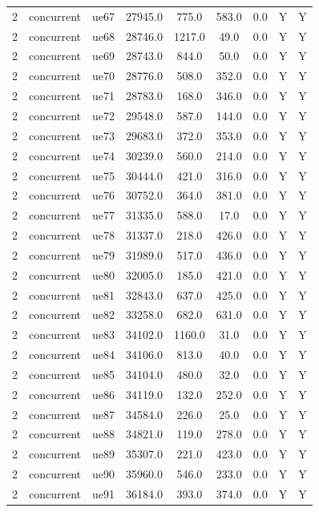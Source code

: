 \begin{table}[ht]
\begin{tabular}{|c|c|c|c|c|c|c|c|c|}
2 & concurrent & ue67 & 27945.0 & 775.0 & 583.0 & 0.0 & Y & Y \\
2 & concurrent & ue68 & 28746.0 & 1217.0 & 49.0 & 0.0 & Y & Y \\
2 & concurrent & ue69 & 28743.0 & 844.0 & 50.0 & 0.0 & Y & Y \\
2 & concurrent & ue70 & 28776.0 & 508.0 & 352.0 & 0.0 & Y & Y \\
2 & concurrent & ue71 & 28783.0 & 168.0 & 346.0 & 0.0 & Y & Y \\
2 & concurrent & ue72 & 29548.0 & 587.0 & 144.0 & 0.0 & Y & Y \\
2 & concurrent & ue73 & 29683.0 & 372.0 & 353.0 & 0.0 & Y & Y \\
2 & concurrent & ue74 & 30239.0 & 560.0 & 214.0 & 0.0 & Y & Y \\
2 & concurrent & ue75 & 30444.0 & 421.0 & 316.0 & 0.0 & Y & Y \\
2 & concurrent & ue76 & 30752.0 & 364.0 & 381.0 & 0.0 & Y & Y \\
2 & concurrent & ue77 & 31335.0 & 588.0 & 17.0 & 0.0 & Y & Y \\
2 & concurrent & ue78 & 31337.0 & 218.0 & 426.0 & 0.0 & Y & Y \\
2 & concurrent & ue79 & 31989.0 & 517.0 & 436.0 & 0.0 & Y & Y \\
2 & concurrent & ue80 & 32005.0 & 185.0 & 421.0 & 0.0 & Y & Y \\
2 & concurrent & ue81 & 32843.0 & 637.0 & 425.0 & 0.0 & Y & Y \\
2 & concurrent & ue82 & 33258.0 & 682.0 & 631.0 & 0.0 & Y & Y \\
2 & concurrent & ue83 & 34102.0 & 1160.0 & 31.0 & 0.0 & Y & Y \\
2 & concurrent & ue84 & 34106.0 & 813.0 & 40.0 & 0.0 & Y & Y \\
2 & concurrent & ue85 & 34104.0 & 480.0 & 32.0 & 0.0 & Y & Y \\
2 & concurrent & ue86 & 34119.0 & 132.0 & 252.0 & 0.0 & Y & Y \\
2 & concurrent & ue87 & 34584.0 & 226.0 & 25.0 & 0.0 & Y & Y \\
2 & concurrent & ue88 & 34821.0 & 119.0 & 278.0 & 0.0 & Y & Y \\
2 & concurrent & ue89 & 35307.0 & 221.0 & 423.0 & 0.0 & Y & Y \\
2 & concurrent & ue90 & 35960.0 & 546.0 & 233.0 & 0.0 & Y & Y \\
2 & concurrent & ue91 & 36184.0 & 393.0 & 374.0 & 0.0 & Y & Y \\

\end{tabular}
\end{table}
